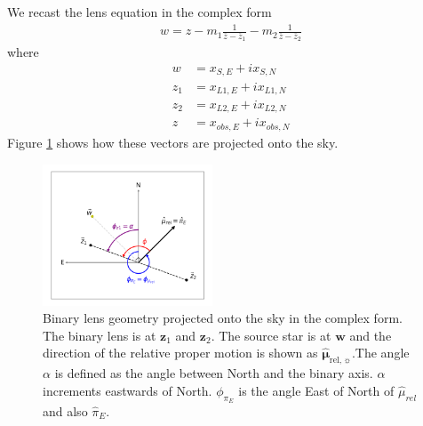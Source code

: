 \documentclass[twocolumn]{aastex701}
\newcommand{\vect}[1]{\boldsymbol{#1}}
\newcommand{\murelhat}{\boldsymbol{\hat{\mu}}_{\boldsymbol{\mathrm{rel}},\sun}}
\begin{document}
We recast the lens equation in the complex form
\begin{eqnarray}
\label{eqn:lenseqn}
    w = z - m_1 \frac{1}{\bar{z} - \bar{z}_1} - m_2 \frac{1}{\bar{z} - \bar{z}_2}
\end{eqnarray}
%
where
\begin{eqnarray}
    w &= x_{S,E} + i x_{S,N} \\
    z_1 &= x_{L1,E} + i x_{L1,N} \\
    z_2 &= x_{L2,E} + i x_{L2,N} \\
    z &= x_{obs,E} + i x_{obs,N}
\end{eqnarray}
Figure \ref{fig:geometry_binary} shows how these vectors are projected onto the sky. 

\begin{figure}
    \centering
    \includegraphics[width=0.45\textwidth]{figures/geometry_schematic_binary_lens.png}
    \caption{
    Binary lens geometry projected onto the sky in the complex form. 
    The binary lens is at $\vect{z}_1$ and $\vect{z}_2$. The source star 
    is at $\vect{w}$ and the direction of the relative proper motion is shown as $\murelhat$.The angle $\alpha$ is defined as the angle between North and the binary axis. $\alpha$ increments eastwards of North. $\phi_{\pi_E}$ is the angle East of North of $\hat{\mu}_{rel}$ and also $\hat{\pi}_E$. 
    \label{fig:geometry_binary}
    }
\end{figure}
\end{document}
